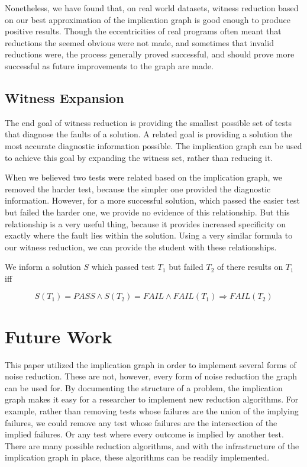 \documentclass[11pt]{article}
\begin{document}
Nonetheless, we have found that, on real world datasets, witness reduction based on our best approximation of the implication graph is good enough to produce positive results. Though the eccentricities of real programs often meant that reductions the seemed obvious were not made, and sometimes that invalid reductions were, the process generally proved successful, and should prove more successful as future improvements to the graph are made.

\subsection{Witness Expansion}

The end goal of witness reduction is providing the smallest possible set of tests that diagnose the faults of a solution. A related goal is providing a solution the most accurate diagnostic information possible. The implication graph can be used to achieve this goal by expanding the witness set, rather than reducing it.

When we believed two tests were related based on the implication graph, we removed the harder test, because the simpler one provided the diagnostic information. However, for a more successful solution, which passed the easier test but failed the harder one, we provide no evidence of this relationship. But this relationship is a very useful thing, because it provides increased specificity on exactly where the fault lies within the solution. Using a very similar formula to our witness reduction, we can provide the student with these relationships.

\centerline{We inform a solution $S$ which passed test $T_1$ but failed $T_2$ of there results on  $T_1$ iff}
$$ S(T_1) = PASS \wedge S(T_2) = FAIL \wedge FAIL(T_1) \Rightarrow FAIL(T_2)$$



\section{Future Work}
This paper utilized the implication graph in order to implement several forms of noise reduction. These are not, however, every form of noise reduction the graph can be used for. By documenting the structure of a problem, the implication graph makes it easy for a researcher to implement new reduction algorithms. For example, rather than removing tests whose failures are the union of the implying failures, we could remove any test whose failures are the intersection of the implied failures. Or any test where every outcome is implied by another test. There are many possible reduction algorithms, and with the infrastructure of the implication graph in place, these algorithms can be readily implemented.
\end{document}
